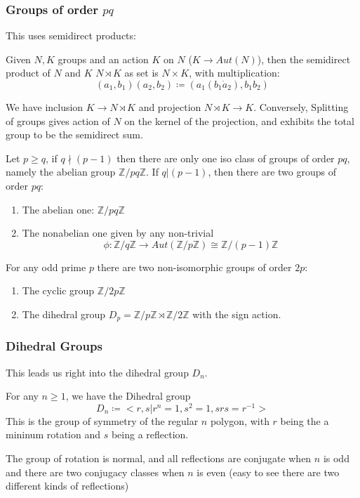 \documentclass[main.tex]{subfiles}
\begin{document}
\subsubsection{Groups of order $pq$}
This uses semidirect products: 
\begin{definition}
Given $N, K$ groups and an action $K$ on $N$ ($K \rightarrow Aut(N)$), then the semidirect product of $N$ and $K$ $N \rtimes K$ as set is $N \times K$, with multiplication:
$$
(a_1, b_1) (a_2, b_2) \coloneqq (a_1 (b_1 \dot a_2), b_1 b_2)
$$
\end{definition}

We have inclusion $K \rightarrow N \rtimes K$ and projection $N \rtimes K \rightarrow K$. Conversely,
Splitting of groups gives action of $N$ on the kernel of the projection, and exhibits the total group to be the semidirect sum.

\begin{proposition}
Let $p \geq q$, if $q \nmid (p-1)$ then there are only one iso class of groups of order $pq$, namely the abelian group $\mathbb{Z}/pq\mathbb{Z}$. If $q | (p-1)$, then there are two groups of order $pq$:
\begin{enumerate}
    \item The abelian one: $\mathbb{Z}/pq\mathbb{Z}$
    \item The nonabelian one given by any non-trivial 
    $$
    \phi: \mathbb{Z}/q\mathbb{Z} \rightarrow Aut(\mathbb{Z}/p\mathbb{Z}) \cong \mathbb{Z}/(p-1)\mathbb{Z}
    $$
\end{enumerate}
\end{proposition}

\begin{corollary}
For any odd prime $p$ there are two non-isomorphic groups of order $2p$:
\begin{enumerate}
    \item The cyclic group $\mathbb{Z}/2p\mathbb{Z}$
    \item The dihedral group $D_p = \mathbb{Z}/p\mathbb{Z} \rtimes \mathbb{Z}/2\mathbb{Z}$ with the sign action.
\end{enumerate}
\end{corollary}




\subsubsection{Dihedral Groups}

This leads us right into the dihedral group $D_n$. 
\begin{definition}

For any $n \geq 1$, we have the Dihedral group 
$$
D_n \coloneqq <r, s| r^n = 1, s^2 = 1, s r s = r^{-1} >
$$
This is the group of symmetry of the regular $n$ polygon, with $r$ being the a mininum rotation and $s$ being a reflection.

The group of rotation is normal, and all reflections are conjugate when $n$ is odd and there are two conjugacy classes when $n$ is even (easy to see there are two different kinds of reflections)
\end{definition}
\end{document}
